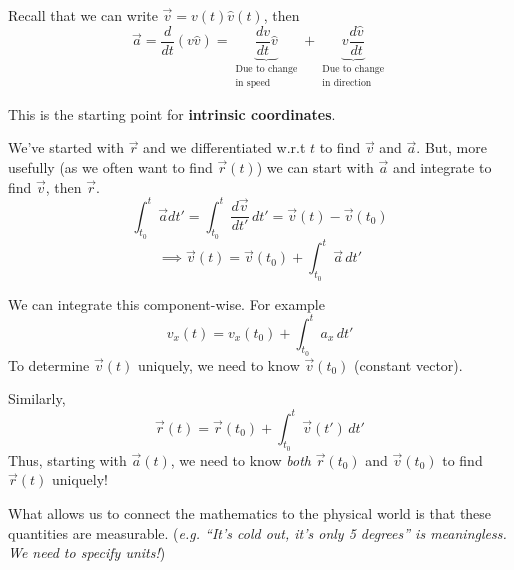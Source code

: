 \documentclass[10pt]{scrartcl}
\begin{document}
Recall that we can write $\vec{v} = v(t)\hat{v}(t)$, then
\[\vec{a} = \frac{d}{dt}(v\hat{v}) = \underbrace{\frac{dv}{dt}\hat{v}}_{\substack{\text{Due to change}\\ \text{in speed}}} + \underbrace{v\frac{d\hat{v}}{dt}}_{\substack{\text{Due to change}\\ \text{in direction}}}\]

\begin{note}
This is the starting point for \textbf{intrinsic coordinates}.
\end{note}

We've started with $\vec{r}$ and we differentiated w.r.t $t$ to find $\vec{v}$ and $\vec{a}$. But, more usefully (as we often want to find $\vec{r}(t)$) we can start with $\vec{a}$ and integrate to find $\vec{v}$, then $\vec{r}$. 
\[\int_{t_0}^{t} \vec{a}dt' = \int_{t_0}^{t} \frac{d\vec{v}}{dt'}\,dt' = \vec{v}(t) - \vec{v}(t_0)
\]
\[\implies \vec{v}(t) = \vec{v}(t_0) + \int_{t_0}^t \vec{a}\,dt'\]

We can integrate this component-wise. For example 
\[v_x(t) = v_x(t_0) + \int_{t_0}^t a_x\,dt'\]
To determine $\vec{v}(t)$ uniquely, we need to know $\vec{v}(t_0)$ (constant vector). 

Similarly,
\[\vec{r}(t) = \vec{r}(t_0) + \int_{t_0}^t \vec{v}(t')\,dt'\]
Thus, starting with $\vec{a}(t)$, we need to know \emph{both} $\vec{r}(t_0)$ and $\vec{v}(t_0)$ to find $\vec{r}(t)$ uniquely! 

\begin{center}
\end{center}

What allows us to connect the mathematics to the physical world is that these quantities are measurable. (\emph{e.g. ``It's cold out, it's only 5 degrees'' is meaningless. We need to specify units!})\\
\end{document}
